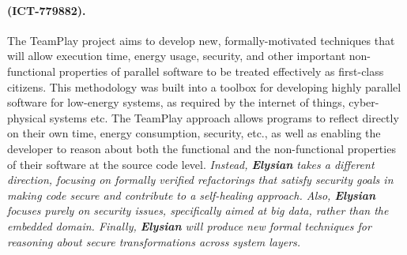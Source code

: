 \documentclass[a4paper,11pt]{article}
\newcommand{\project}[1]{\textbf{#1}\xspace}
\newcommand{\SECURITY}{\project{Elysian}}
\newcommand{\TheProject}{\SECURITY}
\begin{document}
\begin{mdframed}[backgroundcolor=blue!5]
\paragraph{\teamplay (ICT-779882).}
The TeamPlay project aims to develop new, formally-motivated techniques that will allow execution time, energy usage, security, and other important non-functional properties of parallel software to be treated effectively as first-class citizens. This methodology was built into a toolbox for developing highly parallel software for low-energy systems, as required by the internet of things, cyber-physical systems etc. The TeamPlay approach allows programs to reflect directly on their own time, energy consumption, security, etc., as well as enabling the developer to reason about both the functional and the non-functional properties of their software at the source code level. \emph{Instead, \TheProject{} takes a different direction, focusing on formally verified refactorings that satisfy security goals in making code secure and contribute to a self-healing approach. Also, \TheProject{} focuses purely on security issues, specifically aimed at big data, rather than the embedded domain. %
Finally, \TheProject{} will produce new formal techniques for reasoning about secure transformations across system layers.  }

\end{mdframed}



\end{document}

